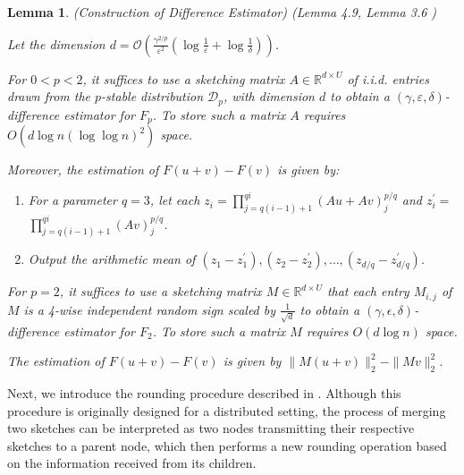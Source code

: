 \documentclass{article}
\theoremstyle{plain}
\newtheorem{lem}[theorem]{Lemma}
\begin{document}
\begin{lem}\label{dif lemma} (Construction of Difference Estimator) (Lemma 4.9, Lemma 3.6 \cite{woodruff2022tight})


Let the dimension $d = \mathcal{O}\left(\frac{\gamma^{2 / p}}{\varepsilon^2}\left(\log \frac{1}{\varepsilon}+\log \frac{1}{\delta}\right)\right)$.

For $0<p<2$, it suffices to use a sketching matrix $A \in \mathbb{R}^{d \times U}$ of i.i.d. entries drawn from the $p$-stable distribution $\mathcal{D}_p$, with dimension $d$ to obtain a $(\gamma, \varepsilon, \delta)$-difference estimator for $F_p$. To store such a matrix $A$ requires $O(d\log n(\log \log n) ^ 2)$  space. 

Moreover, the estimation of $F(u + v)- F(v)$ is given by: 
\begin{enumerate}
    \item For a parameter $q=3$, let each $z_i=\prod_{j=q(i-1)+1}^{q i}\left(A u+A v\right)_j^{p / q}$ and $z_i^{\prime}=$ $\prod_{j=q(i-1)+1}^{q i}(A v)_j^{p / q}$.
    \item Output the arithmetic mean of $\left(z_1-z_1^{\prime}\right),\left(z_2-z_2^{\prime}\right), \ldots,\left(z_{d / q}-z_{d / q}^{\prime}\right)$.
\end{enumerate}

For $p = 2$, it suffices to use a sketching matrix $M \in \mathbb{R} ^ {d\times U}$ that each entry $M_{i,j}$ of $M$ is a 4-wise independent random sign scaled by $\frac 1{\sqrt d}$ to obtain a $(\gamma, \epsilon, \delta)$-difference estimator for $F_2$. To store such a matrix $M$ requires $O(d \log n)$ space.

The estimation of $F(u+v) - F(v)$ is given by $\|M(u+v)\|_2 ^ 2 -\|Mv\|_2^2$.
    
\end{lem}

Next, we introduce the rounding procedure described in \cite{rounding}. Although this procedure is originally designed for a distributed setting, the process of merging two sketches can be interpreted as two nodes transmitting their respective sketches to a parent node, which then performs a new rounding operation based on the information received from its children.
\end{document}
